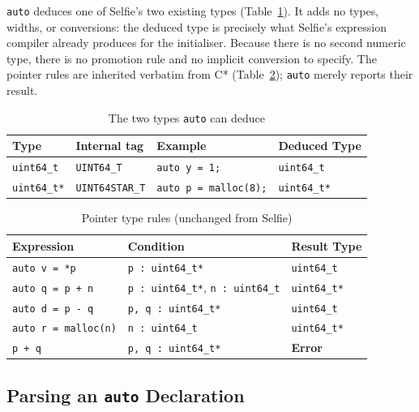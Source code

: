 \documentclass[a4paper,11pt]{article}
\begin{document}
\texttt{auto} deduces one of Selfie's two existing types (Table~\ref{tab:types}). It adds no types, widths, or conversions: the deduced type is precisely what Selfie's expression compiler already produces for the initialiser. Because there is no second numeric type, there is no promotion rule and no implicit conversion to specify. The pointer rules are inherited verbatim from C* (Table~\ref{tab:ptrs}); \texttt{auto} merely reports their result.

\begin{table}[ht]
\centering
\caption{The two types \texttt{auto} can deduce}
\label{tab:types}
\begin{tabular}{llll}
\toprule
\textbf{Type} & \textbf{Internal tag} & \textbf{Example} & \textbf{Deduced Type} \\
\midrule
\texttt{uint64\_t}  & \texttt{UINT64\_T}     & \texttt{auto y = 1;}          & \texttt{uint64\_t}  \\
\texttt{uint64\_t*} & \texttt{UINT64STAR\_T} & \texttt{auto p = malloc(8);}  & \texttt{uint64\_t*} \\
\bottomrule
\end{tabular}
\end{table}

\begin{table}[ht]
\centering
\caption{Pointer type rules (unchanged from Selfie)}
\label{tab:ptrs}
\begin{tabular}{lll}
\toprule
\textbf{Expression}        & \textbf{Condition}                                & \textbf{Result Type} \\
\midrule
\texttt{auto v = *p}       & \texttt{p : uint64\_t*}                           & \texttt{uint64\_t}   \\
\texttt{auto q = p + n}    & \texttt{p : uint64\_t*}, \texttt{n : uint64\_t}   & \texttt{uint64\_t*}  \\
\texttt{auto d = p - q}    & \texttt{p, q : uint64\_t*}                        & \texttt{uint64\_t}   \\
\texttt{auto r = malloc(n)}& \texttt{n : uint64\_t}                            & \texttt{uint64\_t*}  \\
\texttt{p + q}             & \texttt{p, q : uint64\_t*}                        & \textbf{Error}       \\
\bottomrule
\end{tabular}
\end{table}

\subsection{Parsing an \texttt{auto} Declaration}
\label{sec:parse}
\end{document}
